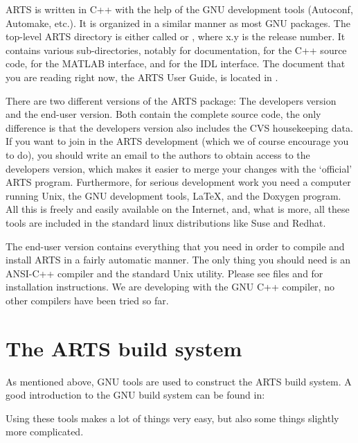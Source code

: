 ARTS is written in C++ with the help of the GNU development tools
(Autoconf, Automake, etc.). It is organized in a similar manner as
most GNU packages. The top-level ARTS directory is either called
 or , where x.y is the release number.
It contains various sub-directories, notably  for
documentation,  for the C++ source code,  for the
MATLAB interface, and  for the IDL interface. The document
that you are reading right now, the ARTS User Guide, is located in
.

There are two different versions of the ARTS package: The developers
version and the end-user version. Both contain the complete source
code, the only difference is that the developers version also includes
the CVS housekeeping data. If you want to join in the ARTS development
(which we of course encourage you to do), you should write an email to
the authors to obtain access to the developers version, which makes it
easier to merge your changes with the `official' ARTS program.
Furthermore, for serious development work you need a computer running
Unix, the GNU development tools, LaTeX, and the Doxygen program.  All
this is freely and easily available on the Internet, and, what is
more, all these tools are included in the standard linux
distributions like Suse and Redhat.

The end-user version contains everything that you need in order to
compile and install ARTS in a fairly automatic manner. The only
thing you should need is an ANSI-C++ compiler and the standard Unix
 utility. Please see files  and
 for installation instructions. We are developing
with the GNU C++ compiler, no other compilers have been tried so
far.

\section{The ARTS build system}

As mentioned above, GNU tools are used to construct the ARTS
build system. A good introduction to the GNU build system can be found in:
\begin{quote}
  \footnotesize
\end{quote}
Using these tools makes a lot of things very easy, but also some
things slightly more complicated.

